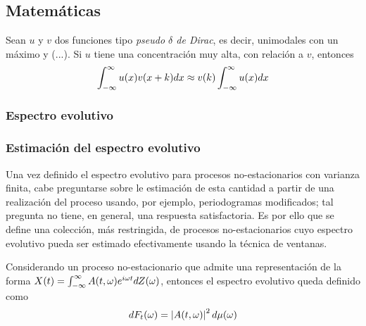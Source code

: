 
\subsection{Matemáticas}

\begin{proposicion}
Sean $u$ y $v$ dos funciones tipo \textit{pseudo $\delta$ de Dirac}, es decir, unimodales con un
máximo  y (...). Si $u$ tiene una concentración muy alta, con relación a $v$, entonces
\begin{equation*}
\int_{-\infty}^{\infty} u(x) v(x+k) dx \approx v(k) \int_{-\infty}^{\infty} u(x) dx
\end{equation*}
\label{pseudo_d}
\end{proposicion}

\subsubsection{Espectro evolutivo}


\subsubsection{Estimación del espectro evolutivo}

Una vez definido el espectro evolutivo para procesos no-estacionarios con varianza finita,
cabe preguntarse sobre le estimación de esta cantidad a partir de una realización del proceso
usando, por ejemplo, periodogramas modificados;
tal pregunta no tiene, en general, una respuesta satisfactoria.
Es por ello que se
define una colección, más restringida, de procesos no-estacionarios cuyo espectro evolutivo pueda
ser estimado efectivamente usando la técnica de ventanas.

Considerando un proceso no-estacionario \xt que admite una representación de la forma
$X(t) = \int_{-\infty}^{\infty} A(t,\omega) e^{i \omega t} dZ(\omega)$, entonces el espectro evolutivo queda
definido como
\begin{equation}
dF_t(\omega) = \left| A(t,\omega) \right|^{2} d\mu(\omega)
\label{esp_evolutivo}
\end{equation}

